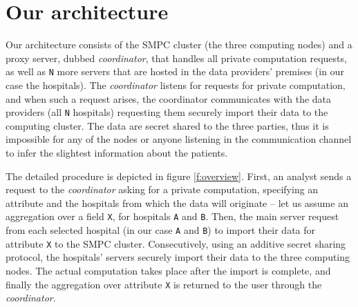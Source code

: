 
\section{Our architecture }\label{s:architecture}
Our architecture consists of the SMPC cluster (the three computing nodes) and a proxy server, dubbed \textit{coordinator}, that handles all private computation requests, as well as \texttt{N} more servers that are hosted in the data providers' premises (in our case the hospitals).
The \textit{coordinator} listens for requests for private computation, and when such a request arises, the coordinator communicates with the data providers (all \texttt{N} hospitals) requesting them securely import their data to the computing cluster.
The data are secret shared to the three parties, thus it is impossible for any of the nodes or anyone listening in the communication channel to infer the slightest information about the patients.



The detailed procedure is depicted in figure \ref{f:overview}.
First, an analyst sends a request to the \textit{coordinator} asking for a private computation, specifying an attribute and the hospitals from which the data will originate -- let us assume an aggregation over a field \texttt{X}, for hospitals \texttt{A} and \texttt{B}.
Then, the main server request from each selected hospital (in our case \texttt{A} and \texttt{B}) to import their data for attribute \texttt{X} to the SMPC cluster.
Consecutively, using an additive secret sharing protocol, the hospitals' servers securely import their data to the three computing nodes.
The actual computation takes place after the import is complete, and finally the aggregation over attribute \texttt{X} is returned to the user through the \textit{coordinator}.




